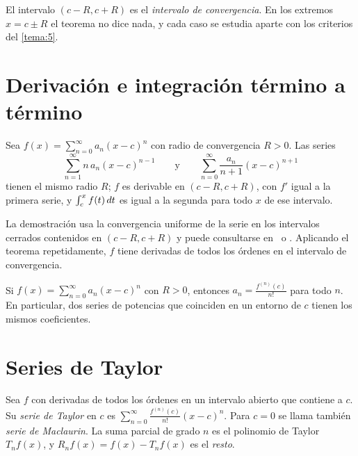 El intervalo $(c-R,c+R)$ es el \emph{intervalo de convergencia}. En los extremos $x=c\pm R$ el teorema no dice nada, y cada caso se estudia aparte con los criterios del \cref{tema:5}.

\addtocounter{definicion}{1}%

\section{Derivación e integración término a término}

\begin{teorema}\label{teo:termino-a-termino}
Sea $f(x)=\sum_{n=0}^{\infty}a_n(x-c)^{n}$ con radio de convergencia $R>0$. Las series
\[
\sum_{n=1}^{\infty}n\,a_n(x-c)^{n-1}\qquad\text{y}\qquad\sum_{n=0}^{\infty}\frac{a_n}{n+1}(x-c)^{n+1}
\]
tienen el mismo radio $R$; $f$ es derivable en $(c-R,c+R)$, con $f'$ igual a la primera serie, y $\int_c^{x}f(t)\mathop{}\!d t$ es igual a la segunda para todo $x$ de ese intervalo.
\end{teorema}

La demostración usa la convergencia uniforme de la serie en los intervalos cerrados contenidos en $(c-R,c+R)$ y puede consultarse en~\cite[cap.~24]{spivak} o \cite[cap.~11]{apostol}. Aplicando el teorema repetidamente, $f$ tiene derivadas de todos los órdenes en el intervalo de convergencia.

\begin{corolario}\label{cor:coeficientes}
Si $f(x)=\sum_{n=0}^{\infty}a_n(x-c)^{n}$ con $R>0$, entonces $a_n=\frac{f^{(n)}(c)}{n!}$ para todo $n$. En particular, dos series de potencias que coinciden en un entorno de $c$ tienen los mismos coeficientes.
\end{corolario}

\addtocounter{definicion}{1}%

\section{Series de Taylor}

\begin{definicion}\label{def:serie-taylor}
Sea $f$ con derivadas de todos los órdenes en un intervalo abierto que contiene a $c$. Su \emph{serie de Taylor} en $c$ es $\sum_{n=0}^{\infty}\frac{f^{(n)}(c)}{n!}(x-c)^{n}$. Para $c=0$ se llama también \emph{serie de Maclaurin}. La suma parcial de grado $n$ es el polinomio de Taylor $T_nf(x)$, y $R_nf(x)=f(x)-T_nf(x)$ es el \emph{resto}.
\end{definicion}

